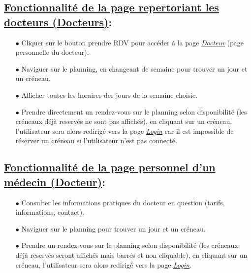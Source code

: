 \documentclass[a4paper]{report}
\begin{document}
\subsection{\underline{Fonctionnalité de la page repertoriant les docteurs (Docteurs)}:}\label{docteurs}
    \begin{itemize}
        \item[$\bullet$] Cliquer sur le bouton prendre RDV pour accéder à la page \textit{\hyperref[docteur]{Docteur}} (page personnelle du docteur).
        \item[$\bullet$] Naviguer sur le planning, en changeant de semaine pour trouver un jour et un créneau.
        \item[$\bullet$] Afficher toutes les horaires des jours de la semaine choisie.
        \item[$\bullet$] Prendre directement un rendez-vous sur le planning selon disponibilité (les créneaux déjà reservés ne sont pas affichés), en cliquant sur un créneau, l’utilisateur sera alors redirigé vers la page \textit{\hyperref[login]{Login}} car il est impossible de réserver un créneau si l'utilisateur n'est pas connecté.
    \end{itemize}
    \vspace{3mm}

\subsection{\underline{Fonctionnalité de la page personnel d'un médecin (Docteur)}:}\label{docteur}
    \begin{itemize}
        \item[$\bullet$] Consulter les informations pratiques du docteur en question (tarifs, informations, contact).
        \item[$\bullet$] Naviguer sur le planning pour trouver un jour et un créneau.
        \item[$\bullet$] Prendre un rendez-vous sur le planning selon disponibilité (les créneaux déjà reservés seront affichés mais barrés et non cliquable), en cliquant sur un créneau, l’utilisateur sera alors redirigé vers la page \textit{\hyperref[login]{Login}}.
    \end{itemize}
    \vspace{3mm}
\end{document}
